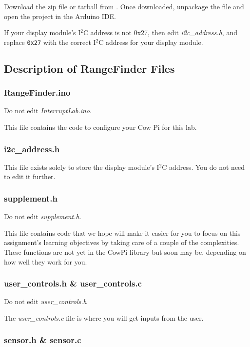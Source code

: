 Download the zip file or tarball from \filesource.
Once downloaded, unpackage the file and open the project in the Arduino IDE\@.

If your display module's I$^2$C address is not 0x27, then edit \textit{i2c\_address.h}, and replace \lstinline{0x27} with the correct I$^2$C address for your display module.

\subsection{Description of RangeFinder Files}

\subsubsection{RangeFinder.ino}

Do not edit \textit{InterruptLab.ino}.

This file contains the code to configure your Cow Pi for this lab.

\subsubsection{i2c\_address.h}

This file exists solely to store the display module's I$^2$C address.
You do not need to edit it further.

\subsubsection{supplement.h}

Do not edit \textit{supplement.h}.

This file contains code that we hope will make it easier for you to focus on this assignment's learning objectives by taking care of a couple of the complexities.
These functions are not yet in the CowPi library but soon may be, depending on how well they work for you.

\subsubsection{user\_controls.h \& user\_controls.c}

Do not edit \textit{user\_controls.h}

The \textit{user\_controls.c} file is where you will get inputs from the user.

\subsubsection{sensor.h \& sensor.c}

